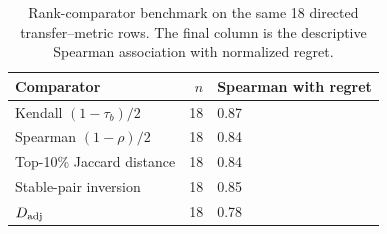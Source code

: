 \begin{table}[H]
\centering
\scriptsize
\caption{Rank-comparator benchmark on the same 18 directed transfer--metric rows. The final column is the descriptive Spearman association with normalized regret.}
\label{tab:rank-comparator}
\begin{tabular}{lrl}
\toprule
Comparator & $n$ & Spearman with regret \\
\midrule
Kendall $(1-\tau_b)/2$ & 18 & 0.87 \\
Spearman $(1-\rho)/2$ & 18 & 0.84 \\
Top-10\% Jaccard distance & 18 & 0.84 \\
Stable-pair inversion & 18 & 0.85 \\
$D_{\rm adj}$ & 18 & 0.78 \\
\bottomrule
\end{tabular}
\end{table}
